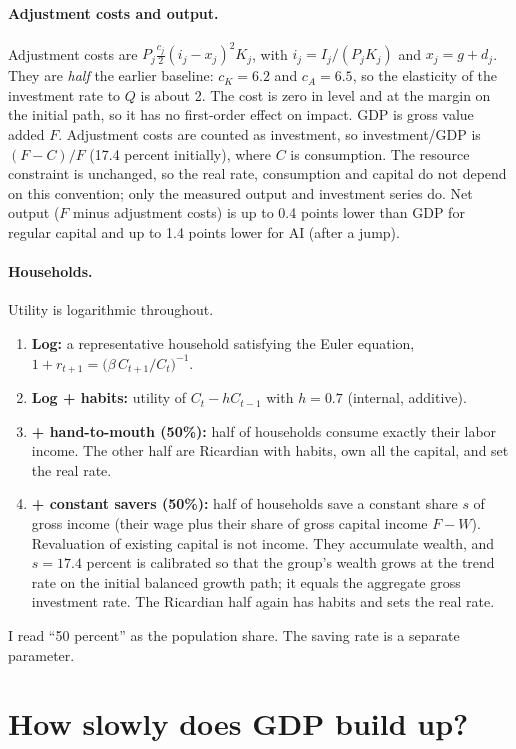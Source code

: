 \documentclass[11pt]{article}
\begin{document}
\paragraph{Adjustment costs and output.} Adjustment costs are $P_j\tfrac{c_j}{2}(i_j-x_j)^2K_j$, with $i_j=I_j/(P_jK_j)$ and $x_j=g+d_j$. They are \emph{half} the earlier baseline:
$c_K=6.2$ and $c_A=6.5$, so the elasticity of the investment rate to $Q$ is about 2. The cost is zero in level and at the margin on the initial path, so it has no first-order effect on impact. GDP is gross value added $F$.
Adjustment costs are counted as investment, so investment/GDP is $(F-C)/F$ (17.4 percent initially), where $C$ is consumption.
The resource constraint is unchanged, so the real rate, consumption and capital do not depend on this convention; only the measured output and investment series do.
Net output ($F$ minus adjustment costs) is up to 0.4 points lower than GDP for regular capital and up to 1.4 points lower for AI (after a jump).

\paragraph{Households.} Utility is logarithmic throughout.
\begin{enumerate}
\item \textbf{Log:} a representative household satisfying the Euler equation, $1+r_{t+1}=\big(\beta\,C_{t+1}/C_t\big)^{-1}$.
\item \textbf{Log + habits:} utility of $C_t-hC_{t-1}$ with $h=0.7$ (internal, additive).
\item \textbf{+ hand-to-mouth (50\%):} half of households consume exactly their labor income. The other half are Ricardian with habits,
own all the capital, and set the real rate.
\item \textbf{+ constant savers (50\%):} half of households save a constant share $s$ of gross income (their wage plus their share of gross capital income $F-W$).
Revaluation of existing capital is not income. They accumulate wealth, and $s=17.4$ percent is calibrated so that the group's wealth grows at the trend rate on the
initial balanced growth path; it equals the aggregate gross investment rate. The Ricardian half again has habits and sets the real rate.
\end{enumerate}
I read ``50 percent'' as the population share. The saving rate is a separate parameter.

\section{How slowly does GDP build up?}
\end{document}
